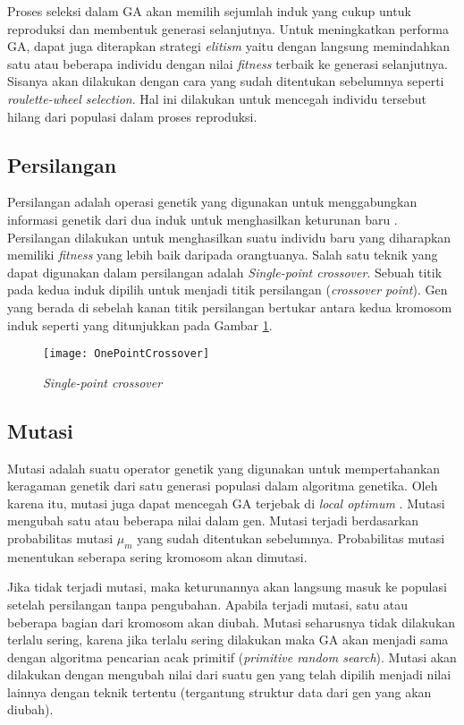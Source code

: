 Proses seleksi dalam GA akan memilih sejumlah induk yang cukup untuk reproduksi dan membentuk generasi selanjutnya. Untuk meningkatkan performa GA, dapat juga diterapkan strategi \textit{elitism} yaitu dengan langsung memindahkan satu atau beberapa individu dengan nilai \textit{fitness} terbaik ke generasi selanjutnya. Sisanya akan dilakukan dengan cara yang sudah ditentukan sebelumnya seperti \textit{roulette-wheel selection}. Hal ini dilakukan untuk mencegah individu tersebut hilang dari populasi dalam proses reproduksi.

\subsection{Persilangan}
\label{sub:crossover}
Persilangan adalah operasi genetik yang digunakan untuk menggabungkan informasi genetik dari dua induk untuk menghasilkan keturunan baru \cite{sivanandam2007introduction}. Persilangan dilakukan untuk menghasilkan suatu individu baru yang diharapkan memiliki \textit{fitness} yang lebih baik daripada orangtuanya. Salah satu teknik yang dapat digunakan dalam persilangan adalah \textit{Single-point crossover}. Sebuah titik pada kedua induk dipilih untuk menjadi titik persilangan (\textit{crossover point}). Gen yang berada di sebelah kanan titik persilangan bertukar antara kedua kromosom induk seperti yang ditunjukkan pada Gambar \ref{fig:spcrossover}.

\begin{figure}[h]
	\begin{center}
		\texttt{[image: OnePointCrossover]}
		\caption{\textit{Single-point crossover}}
		\label{fig:spcrossover}
	\end{center}
\end{figure}

\subsection{Mutasi}
\label{sub:mutation}
Mutasi adalah suatu operator genetik yang digunakan untuk mempertahankan keragaman genetik dari satu generasi populasi dalam algoritma genetika. Oleh karena itu, mutasi juga dapat mencegah GA terjebak di \textit{local optimum} \cite{sivanandam2007introduction}. Mutasi mengubah satu atau beberapa nilai dalam gen. Mutasi terjadi berdasarkan probabilitas mutasi $\mu_m$ yang sudah ditentukan sebelumnya. Probabilitas mutasi menentukan seberapa sering kromosom akan dimutasi. 

Jika tidak terjadi mutasi, maka keturunannya akan langsung masuk ke populasi setelah persilangan tanpa pengubahan. Apabila terjadi mutasi, satu atau beberapa bagian dari kromosom akan diubah. Mutasi seharusnya tidak dilakukan terlalu sering, karena jika terlalu sering dilakukan maka GA akan menjadi sama dengan algoritma pencarian acak primitif (\textit{primitive random search}). Mutasi akan dilakukan dengan mengubah nilai dari suatu gen yang telah dipilih menjadi nilai lainnya dengan teknik tertentu (tergantung struktur data dari gen yang akan diubah).


